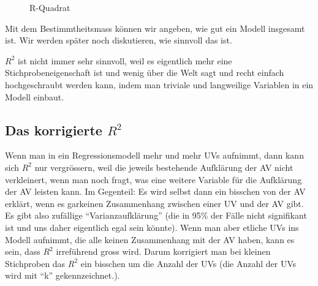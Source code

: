 \documentclass[
  10pt,
  letterpaper,
  a4paper, twoside]{scrreprt}
\begin{document}
\begin{figure}


\caption{\label{fig-SumOfSquares}R-Quadrat}

\end{figure}%

Mit dem Bestimmtheitsmass können wir angeben, wie gut ein Modell
insgesamt ist. Wir werden später noch diskutieren, wie sinnvoll das ist.

\begin{tcolorbox}[enhanced jigsaw, coltitle=black, opacitybacktitle=0.6, toptitle=1mm, colbacktitle=quarto-callout-note-color!10!white, colback=white, toprule=.15mm, opacityback=0, bottomrule=.15mm, arc=.35mm, colframe=quarto-callout-note-color-frame, leftrule=.75mm, titlerule=0mm, breakable, left=2mm, rightrule=.15mm, title={Spoiler}, bottomtitle=1mm]

\(R^2\) ist nicht immer sehr sinnvoll, weil es eigentlich mehr eine
Stichprobeneigenschaft ist und wenig über die Welt sagt und recht
einfach hochgeschraubt werden kann, indem man triviale und langweilige
Variablen in ein Modell einbaut.

\end{tcolorbox}

\subsection{\texorpdfstring{Das korrigierte
\(R^2\)}{Das korrigierte R\^{}2}}\label{das-korrigierte-r2}

Wenn man in ein Regressionsmodell mehr und mehr UVs aufnimmt, dann kann
sich \(R^2\) nur vergrössern, weil die jeweils bestehende Aufklärung der
AV nicht verkleinert, wenn man noch fragt, was eine weitere Variable für
die Aufklärung der AV leisten kann. Im Gegenteil: Es wird selbst dann
ein bisschen von der AV erklärt, wenn es garkeinen Zusammenhang zwischen
einer UV und der AV gibt. Es gibt also zufällige
\enquote{Varianzaufklärung} (die in 95\% der Fälle nicht signifikant ist
und uns daher eigentlich egal sein könnte). Wenn man aber etliche UVs
ins Modell aufnimmt, die alle keinen Zusammenhang mit der AV haben, kann
es sein, dass \(R^2\) irreführend gross wird. Darum korrigiert man bei
kleinen Stichproben das \(R^2\) ein bisschen um die Anzahl der UVs (die
Anzahl der UVs wird mit \enquote{k} gekennzeichnet.).
\end{document}
